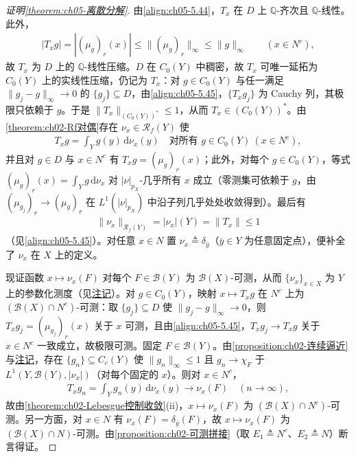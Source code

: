 \documentclass[../../main.tex]{subfiles}%
\begin{document}
\begin{proof}[证明\cref{theorem:ch05-离散分解}]
由\eqref{align:ch05-5.44}，$T_x$ 在 $D$ 上 $\mathbb{Q}$-齐次且 $\mathbb{Q}$-线性。此外，
\begin{align}
|T_xg|=|(\mu_g)_r(x)|\leqslant\|(\mu_g)_r\|_\infty\leqslant\|g\|_\infty
\qquad(x\in N^c),\label{align:ch05-5.45}
\end{align}
故 $T_x$ 为 $D$ 上的 $\mathbb{Q}$-线性压缩。$D$ 在 $C_0(Y)$ 中稠密，故 $T_x$ 可唯一延拓为 $C_0(Y)$ 上的实线性压缩，仍记为 $T_x$：对 $g\in C_0(Y)$ 与任一满足 $\|g_j-g\|_\infty\to0$ 的 $\{g_j\}\subseteq D$，由\eqref{align:ch05-5.45}，$\{T_xg_j\}$ 为 Cauchy 列，其极限只依赖于 $g$。于是 $\|T_x\|_{(C_0(Y))^*}\leqslant1$，从而 $T_x\in(C_0(Y))^*$。由\cref{theorem:ch02-Rf对偶}存在 $\nu_x\in\mathscr{R}_f(Y)$ 使
\begin{align}
T_xg=\int_Y g(y)\,\mathrm{d}\nu_x(y)
\quad\text{对所有 }g\in C_0(Y)\ (x\in N^c),\label{align:ch05-5.46}
\end{align}
并且对 $g\in D$ 与 $x\in N^c$ 有 $T_xg=(\mu_g)_r(x)$；此外，对每个 $g\in C_0(Y)$，等式 $(\mu_g)_r(x)=\int_Yg\,\mathrm{d}\nu_x$ 对 $|\nu|_{p_X}$-几乎所有 $x$ 成立（零测集可依赖于 $g$，由 $(\mu_{g_j})_r\to(\mu_g)_r$ 在 $L^1(|\nu|_{p_X})$ 中沿子列几乎处处收敛得到）。最后有
\begin{align}
\|\nu_x\|_{\mathscr{R}_f(Y)}=|\nu_x|(Y)=\|T_x\|\leqslant1\label{align:ch05-5.47}
\end{align}
（见\eqref{align:ch05-5.45}）。对任意 $x\in N$ 置 $\nu_x\triangleq\delta_{\bar{y}}$（$\bar{y}\in Y$ 为任意固定点），便补全了 $\nu_x$ 在 $X$ 上的定义。

现证函数 $x\mapsto\nu_x(F)$ 对每个 $F\in\mathscr{B}(Y)$ 为 $\mathscr{B}(X)$-可测，从而 $\{\nu_x\}_{x\in X}$ 为 $Y$ 上的参数化测度（见\hyperref[remark:ch05-参数测度等价]{注记}）。对 $g\in C_0(Y)$，映射 $x\mapsto T_xg$ 在 $N^c$ 上为 $(\mathscr{B}(X)\cap N^c)$-可测：取 $\{g_j\}\subseteq D$ 使 $\|g_j-g\|_\infty\to0$，则 $T_xg_j=(\mu_{g_j})_r(x)$ 关于 $x$ 可测，且由\eqref{align:ch05-5.45}，$T_xg_j\to T_xg$ 关于 $x\in N^c$ 一致成立，故极限可测。固定 $F\in\mathscr{B}(Y)$。由\cref{proposition:ch02-连续逼近}与\hyperref[remark:ch02-连续逼近注]{注记}，存在 $\{g_n\}\subseteq C_c(Y)$ 使 $\|g_n\|_\infty\leqslant1$ 且 $g_n\to\chi_F$ 于 $L^1(Y,\mathscr{B}(Y),|\nu_x|)$（对每个固定的 $x$）。则对 $x\in N^c$，
\begin{align*}
T_xg_n=\int_Y g_n(y)\,\mathrm{d}\nu_x(y)\to\nu_x(F)
\quad(n\to\infty),
\end{align*}
故由\cref{theorem:ch02-Lebesgue控制收敛}(ii)，$x\mapsto\nu_x(F)$ 为 $(\mathscr{B}(X)\cap N^c)$-可测。另一方面，对 $x\in N$ 有 $\nu_x(F)=\delta_{\bar{y}}(F)$，故 $x\mapsto\nu_x(F)$ 为 $(\mathscr{B}(X)\cap N)$-可测。由\cref{proposition:ch02-可测拼接}（取 $E_1\triangleq N^c$、$E_2\triangleq N$）断言得证。


\end{proof}
\end{document}
